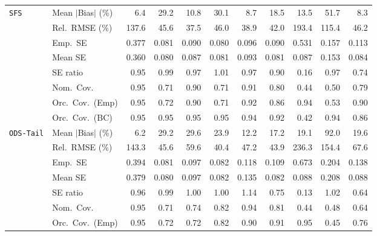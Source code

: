 \begin{landscape}
\begin{longtable}{llrrrrrrrrr}
\addlinespace[2pt]
\quad \texttt{SFS} & Mean $|$Bias$|$ (\%) & \cellcolor{rankone}6.4 & 29.2 & 10.8 & 30.1 & \cellcolor{rankthree}8.7 & 18.5 & 13.5 & 51.7 & \cellcolor{ranktwo}8.3 \\
 & Rel.\ RMSE (\%) & 137.6 & 45.6 & \cellcolor{rankone}37.5 & 46.0 & \cellcolor{ranktwo}38.9 & \cellcolor{rankthree}42.0 & 193.4 & 115.4 & 46.2 \\
 & Emp.\ SE & 0.377 & 0.081 & 0.090 & 0.080 & 0.096 & 0.090 & 0.531 & 0.157 & 0.113 \\
 & Mean SE & 0.360 & 0.080 & 0.087 & 0.081 & 0.093 & 0.081 & 0.087 & 0.153 & 0.084 \\
 & SE ratio & \cellcolor{rankthree}0.95 & \cellcolor{rankone}0.99 & \cellcolor{ranktwo}0.97 & \cellcolor{rankone}1.01 & \cellcolor{ranktwo}0.97 & 0.90 & 0.16 & \cellcolor{ranktwo}0.97 & 0.74 \\
 & Nom.\ Cov. & \cellcolor{rankone}0.95 & 0.71 & \cellcolor{rankthree}0.90 & 0.71 & \cellcolor{ranktwo}0.91 & 0.80 & 0.44 & 0.50 & 0.79 \\
 & Orc.\ Cov.\ (Emp) & \cellcolor{rankone}0.95 & 0.72 & 0.90 & 0.71 & \cellcolor{rankthree}0.92 & 0.86 & \cellcolor{ranktwo}0.94 & 0.53 & 0.90 \\
 & Orc.\ Cov.\ (BC) & \cellcolor{rankone}0.95 & \cellcolor{rankone}0.95 & \cellcolor{rankone}0.95 & \cellcolor{rankone}0.95 & \cellcolor{ranktwo}0.94 & \cellcolor{rankthree}0.92 & 0.42 & \cellcolor{ranktwo}0.94 & 0.86 \\
\addlinespace[2pt]
\quad \texttt{ODS-Tail} & Mean $|$Bias$|$ (\%) & \cellcolor{rankone}6.2 & 29.2 & 29.6 & 23.9 & \cellcolor{ranktwo}12.2 & \cellcolor{rankthree}17.2 & 19.1 & 92.0 & 19.6 \\
 & Rel.\ RMSE (\%) & 143.3 & \cellcolor{rankthree}45.6 & 59.6 & \cellcolor{rankone}40.4 & 47.2 & \cellcolor{ranktwo}43.9 & 236.3 & 154.4 & 67.6 \\
 & Emp.\ SE & 0.394 & 0.081 & 0.097 & 0.082 & 0.118 & 0.109 & 0.673 & 0.204 & 0.138 \\
 & Mean SE & 0.379 & 0.080 & 0.097 & 0.082 & 0.135 & 0.082 & 0.088 & 0.208 & 0.088 \\
 & SE ratio & 0.96 & \cellcolor{ranktwo}0.99 & \cellcolor{rankone}1.00 & \cellcolor{rankone}1.00 & 1.14 & 0.75 & 0.13 & \cellcolor{rankthree}1.02 & 0.64 \\
 & Nom.\ Cov. & \cellcolor{rankone}0.95 & 0.71 & 0.74 & \cellcolor{rankthree}0.82 & \cellcolor{ranktwo}0.94 & 0.81 & 0.44 & 0.48 & 0.64 \\
 & Orc.\ Cov.\ (Emp) & \cellcolor{rankone}0.95 & 0.72 & 0.72 & 0.82 & \cellcolor{rankthree}0.90 & \cellcolor{ranktwo}0.91 & \cellcolor{rankone}0.95 & 0.45 & 0.76 \\

\end{longtable}
\end{landscape}
